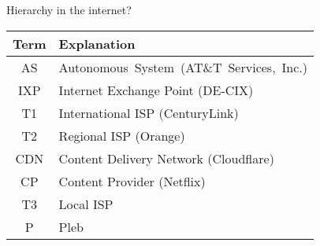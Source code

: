 \documentclass{beamer}
\begin{document}
\begin{frame}[t]{Hierarchy in the internet?}
\begin{minipage}[t]{0.4\textwidth}
  \begin{table}[htbp]
    \centering
    \tiny %
    \begin{tabular}{|c|p{4.25cm}|}
      \hline
      \textbf{Term} & \textbf{Explanation} \\
      \hline
      \textcolor{bitcoinorange}{AS} & \mbox{\textcolor{bitcoinorange}{Autonomous System (AT\&T Services, Inc.)}} \\
      \hline
      \textcolor{gray!95}{IXP} & \textcolor{gray!95}{Internet Exchange Point (DE-CIX)} \\
      \hline
      \textcolor{gray!70}{T1} & \textcolor{gray!70}{International ISP (CenturyLink)} \\
      \hline
      \textcolor{gray!50}{T2} & \textcolor{gray!50}{Regional ISP (Orange)} \\
      \hline
      \textcolor{gray!50}{CDN} & \textcolor{gray!50}{Content Delivery Network (Cloudflare)} \\
      \hline
      \textcolor{gray!50}{CP} & \textcolor{gray!50}{Content Provider (Netflix)} \\
      \hline
      \textcolor{gray!30}{T3} & \textcolor{gray!15}{Local ISP} \\
      \hline
      \textcolor{bitcoinorange}{P} & \textcolor{bitcoinorange}{Pleb} \\
      \hline
    \end{tabular}
  \end{table}

  \end{minipage}%
  \begin{minipage}[t]{0.6\textwidth} %
    \vspace*{-0.7cm} %
\begin{figure}
  \centering
  \begin{tikzpicture}[-latex, auto, semithick,
    state/.style 2 args={
      circle,
      top color=white,
      bottom color=##2,
      draw=gray!#1!black,
      text=blue,
      minimum width=1cm,
    },
    level 1/.style={sibling distance=3cm, level distance=1.5cm},
    level 2/.style={sibling distance=1.5cm, level distance=1.5cm},
    level 3/.style={sibling distance=1cm, level distance=1.5cm}
  ]


\end{tikzpicture}
\end{figure}
\end{minipage}
\end{frame}
\end{document}
